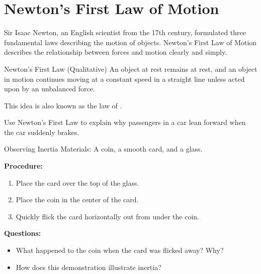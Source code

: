 \section{Newton's First Law of Motion}

Sir Isaac Newton, an English scientist from the 17th century, formulated three fundamental laws describing the motion of objects. Newton's First Law of Motion describes the relationship between forces and motion clearly and simply.


\begin{keyconcept}{Newton's First Law (Qualitative)}
An object at rest remains at rest, and an object in motion continues moving at a constant speed in a straight line unless acted upon by an unbalanced force.
\end{keyconcept}

This idea is also known as the law of .


\begin{stopandthink}
Use Newton's First Law to explain why passengers in a car lean forward when the car suddenly brakes.
\end{stopandthink}

\begin{investigation}{Observing Inertia}
Materials: A coin, a smooth card, and a glass.

\textbf{Procedure:}
\begin{enumerate}
    \item Place the card over the top of the glass.
    \item Place the coin in the center of the card.
    \item Quickly flick the card horizontally out from under the coin.
\end{enumerate}

\textbf{Questions:}
\begin{itemize}
    \item What happened to the coin when the card was flicked away? Why?
    \item How does this demonstration illustrate inertia?
\end{itemize}
\end{investigation}

